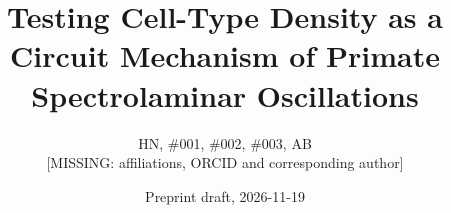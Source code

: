 \documentclass[11pt]{article}
\title{Testing Cell-Type Density as a Circuit Mechanism of Primate Spectrolaminar Oscillations}
\author{HN, \#001, \#002, \#003, AB\\{}[MISSING: affiliations, ORCID and corresponding author]}
\date{Preprint draft, 2026-11-19}
\begin{document}
\maketitle
\linenumbers











\clearpage

\end{document}
